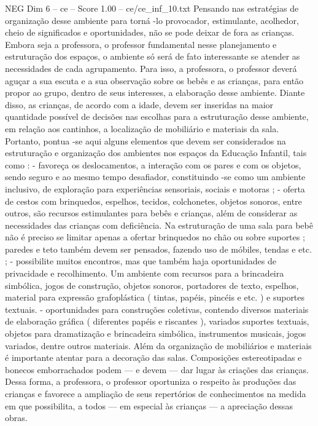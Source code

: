 \begin{textsample}{NEG Dim 6 – ce – Score 1.00 – ce/ce\_inf\_10.txt}
Pensando nas estratégias de organização desse ambiente para torná -lo provocador, estimulante, acolhedor, cheio de significados e oportunidades, não se pode deixar de fora as crianças.
Embora seja a professora, o professor fundamental nesse planejamento e estruturação dos espaços, o ambiente só será de fato interessante se atender as necessidades de cada agrupamento.
Para isso, a professora, o professor deverá aguçar a sua escuta e a sua observação sobre os bebês e as crianças, para então propor ao grupo, dentro de seus interesses, a elaboração desse ambiente.
Diante disso, as crianças, de acordo com a idade, devem ser inseridas na maior quantidade possível de decisões nas escolhas para a estruturação desse ambiente, em relação aos cantinhos, a localização de mobiliário e materiais da sala.
Portanto, pontua -se aqui alguns elementos que devem ser considerados na estruturação e organização dos ambientes nos espaços da Educação Infantil, tais como : - favoreça os deslocamentos, a interação com os pares e com os objetos, sendo seguro e ao mesmo tempo desafiador, constituindo -se como um ambiente inclusivo, de exploração para experiências sensoriais, sociais e motoras ; - oferta de cestos com brinquedos, espelhos, tecidos, colchonetes, objetos sonoros, entre outros, são recursos estimulantes para bebês e crianças, além de considerar as necessidades das crianças com deficiência.
Na estruturação de uma sala para bebê não é preciso se limitar apenas a ofertar brinquedos no chão ou sobre suportes ; paredes e teto também devem ser pensados, fazendo uso de móbiles, tendas e etc. ; - possibilite muitos encontros, mas que também haja oportunidades de privacidade e recolhimento.
Um ambiente com recursos para a brincadeira simbólica, jogos de construção, objetos sonoros, portadores de texto, espelhos, material para expressão grafoplástica ( tintas, papéis, pincéis e etc. ) e suportes textuais. - oportunidades para construções coletivas, contendo diversos materiais de elaboração gráfica ( diferentes papéis e riscantes ), variados suportes textuais, objetos para dramatização e brincadeira simbólica, instrumentos musicais, jogos variados, dentre outros materiais.
Além da organização de mobiliários e materiais é importante atentar para a decoração das salas.
Composições estereotipadas e bonecos emborrachados podem — e devem — dar lugar às criações das crianças.
Dessa forma, a professora, o professor oportuniza o respeito às produções das crianças e favorece a ampliação de seus repertórios de conhecimentos na medida em que possibilita, a todos — em especial às crianças — a apreciação dessas obras.

\end{textsample}
